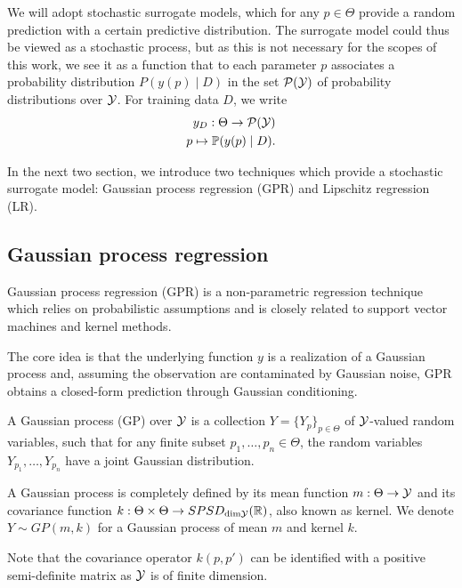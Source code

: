 We will adopt stochastic surrogate models, which for any $p \in \Theta$ provide a random prediction with a certain predictive distribution. 
The surrogate model could thus be viewed as a stochastic process, but as this is not necessary for the scopes of this work, we see it as a function that to each parameter $p$ associates a probability distribution $ P( y(p) \mid D)$ in the set $\mathcal P (\mathcal Y)$ of probability distributions over $\mathcal Y$.
For training data $D$, we write \begin{align*}
    y_D : \Theta \rightarrow \mathcal P( \mathcal Y) \\
    p \mapsto \mathbb P( y(p) \mid D).
\end{align*}

In the next two section, we introduce two techniques which provide a stochastic surrogate model: Gaussian process regression (GPR) and Lipschitz regression (LR).

\subsection{Gaussian process regression}\label{sec:GPR}
Gaussian process regression (GPR) is a non-parametric regression technique which relies on probabilistic assumptions and is closely related to support vector machines and kernel methods.

The core idea is that the underlying function $y$ is a realization of a Gaussian process and, assuming the observation are contaminated by Gaussian noise, GPR obtains a closed-form prediction through Gaussian conditioning.\medbreak

\begin{dfn} 
    A Gaussian process (GP) over $\mathcal Y$ is a collection $Y = \{Y_p\}_{p\in\Theta}$ of $\mathcal Y$-valued random variables, such that for any finite subset $p_1, \ldots, p_n \in \Theta$, the random variables $Y_{p_1}, \ldots, Y_{p_n}$ have a joint Gaussian distribution.

    A Gaussian process is completely defined by its mean function $m: \Theta \rightarrow \mathcal Y$ and its covariance function $k: \Theta \times \Theta \rightarrow SPSD_{\text{dim}\mathcal Y}(\mathbb{R})$, also known as kernel. 
    We denote $Y \sim GP(m, k)$ for a Gaussian process of mean $m$ and kernel $k$.
\end{dfn}
Note that the covariance operator $k(p, p')$ can be identified with a positive semi-definite matrix as $\mathcal Y$ is of finite dimension. \medbreak

